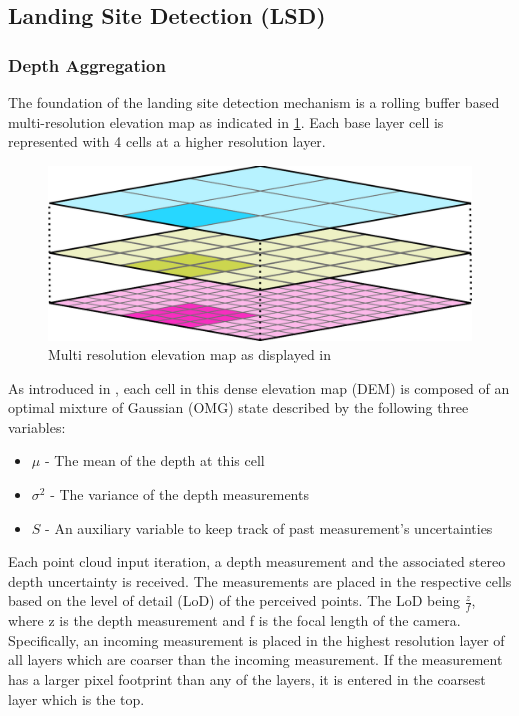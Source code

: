 \subsection{Landing Site Detection (LSD)}\label{subsec:setup:LSD}

\subsubsection{Depth Aggregation}\label{subsubsec:setup:aggregation}

The foundation of the landing site detection mechanism is a rolling buffer based multi-resolution elevation map as indicated in \cref{fig:DEM}. Each base layer cell is represented with 4 cells at a higher resolution layer.

\begin{figure}[ht!]
    \centering
    \includegraphics[scale=0.25]{images/system_overview/DEM.png}
    \caption{Multi resolution elevation map as displayed in \citep{LSD1}}
    \label{fig:DEM}
\end{figure}

As introduced in \citet{LSD2}, each cell in this dense elevation map (DEM) is composed of an optimal mixture of Gaussian (OMG) state described by the following three variables:

\begin{itemize}
    \item $\mu$ - The mean of the depth at this cell
    \item $\sigma^2$ - The variance of the depth measurements
    \item $S$ - An auxiliary variable to keep track of past measurement's uncertainties
\end{itemize}

Each point cloud input iteration, a depth measurement and the associated stereo depth uncertainty is received. The measurements are placed in the respective cells based on the level of detail (LoD) of the perceived points. The LoD being $\frac{z}{f}$, where z is the depth measurement and f is the focal length of the camera. Specifically, an incoming measurement is placed in the highest resolution layer of all layers which are coarser than the incoming measurement. If the measurement has a larger pixel footprint than any of the layers, it is entered in the coarsest layer which is the top.

